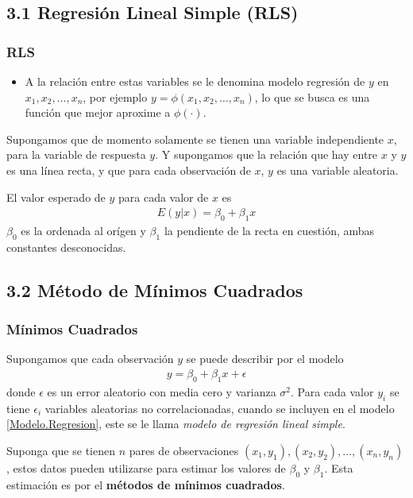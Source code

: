 \documentclass{beamer}
\begin{document}
\subsection{3.1 Regresi\'on Lineal Simple (RLS)}
\begin{frame}\frametitle{RLS}
\begin{itemize}

\item A la relaci\'on entre estas variables se le denomina modelo regresi\'on de $y$ en $x_{1},x_{2},\ldots,x_{n}$, por ejemplo $y=\phi\left(x_{1},x_{2},\ldots,x_{n}\right)$, lo que se busca es una funci\'on que mejor aproxime a $\phi\left(\cdot\right)$.

\end{itemize}

Supongamos que de momento solamente se tienen una variable independiente $x$, para la variable de respuesta $y$. Y supongamos que la relaci\'on que hay entre $x$ y $y$ es una l\'inea recta, y que para cada observaci\'on de $x$, $y$ es una variable aleatoria.

El valor esperado de $y$ para cada valor de $x$ es
\begin{eqnarray}
E\left(y|x\right)=\beta_{0}+\beta_{1}x
\end{eqnarray}
$\beta_{0}$ es la ordenada al or\'igen y $\beta_{1}$ la pendiente de la recta en cuesti\'on, ambas constantes desconocidas. 

\end{frame}

\subsection{3.2 M\'etodo de M\'inimos Cuadrados}
\begin{frame}\frametitle{M\'inimos Cuadrados}
Supongamos que cada observaci\'on $y$ se puede describir por el modelo
\begin{eqnarray}\label{Modelo.Regresion}
y=\beta_{0}+\beta_{1}x+\epsilon
\end{eqnarray}
donde $\epsilon$ es un error aleatorio con media cero y varianza $\sigma^{2}$. Para cada valor $y_{i}$ se tiene $\epsilon_{i}$ variables aleatorias no correlacionadas, cuando se incluyen en el modelo \ref{Modelo.Regresion}, este se le llama \textit{modelo de regresi\'on lineal simple}.


Suponga que se tienen $n$ pares de observaciones $\left(x_{1},y_{1}\right),\left(x_{2},y_{2}\right),\ldots,\left(x_{n},y_{n}\right)$, estos datos pueden utilizarse para estimar los valores de $\beta_{0}$ y $\beta_{1}$. Esta estimaci\'on es por el \textbf{m\'etodos de m\'inimos cuadrados}.
\end{frame}
\end{document}

